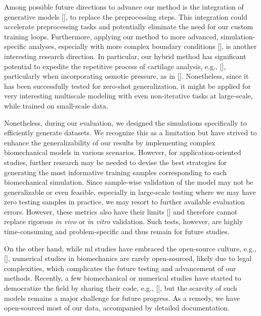 Among possible future directions to advance our method is the integration of generative models [\cite{rezende2014,kingma2014}], to replace the preprocessing steps. This integration could accelerate preprocessing tasks and potentially eliminate the need for our custom training loops. Furthermore, applying our method to more advanced, simulation-specific analyses, especially with more complex boundary conditions [\cite{lenhart2015}], is another interesting research direction. In particular, our hybrid method has significant potential to expedite the repetitive process of cartilage analysis, e.g., [\cite{elahi2021}], particularly when incorporating osmotic pressure, as in [\cite{elahi2023}]. Nonetheless, since it has been successfully tested for zero-shot generalization, it might be applied for very interesting multiscale modeling with even non-iterative tasks at large-scale, while trained on small-scale data.

Nonetheless, during our evaluation, we designed the simulations specifically to efficiently generate datasets. We recognize this as a limitation but have strived to enhance the generalizability of our results by implementing complex biomechanical models in various scenarios. However, for application-oriented studies, further research may be needed to devise the best strategies for generating the most informative training samples corresponding to each biomechanical simulation. Since sample-wise validation of the model may not be generalizable or even feasible, especially in large-scale testing where we may have zero testing samples in practice, we may resort to further available evaluation errors. However, these metrics also have their limits [\cite{barocas2023}] and therefore cannot replace rigorous \textit{in vivo} or \textit{in vitro} validation. Such tests, however, are highly time-consuming and problem-specific and thus remain for future studies.

On the other hand, while \ac{ml} studies have embraced the open-source culture, e.g., [\cite{panfilov2019,desai2019,desai2021,thomas2021,panfilov2022}], numerical studies in biomechanics are rarely open-sourced, likely due to legal complexities, which complicates the future testing and advancement of our methods. Recently, a few biomechanical or numerical studies have started to democratize the field by sharing their code, e.g., [\cite{fehervary2020,maes2023,chokhandre2021}], but the scarcity of such models remains a major challenge for future progress. As a remedy, we have open-sourced most of our data, accompanied by detailed documentation.

